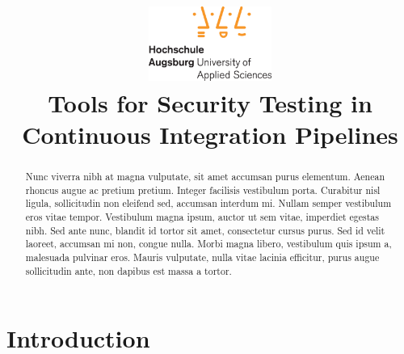\documentclass[conference]{IEEEtran}
\begin{document}
\title{
	\includegraphics[width=4cm]{fig/hsa_logo.eps}\\
	\vspace{0.6cm}
	Tools for Security Testing in Continuous Integration Pipelines}

\author{
}

\maketitle

% 

\begin{abstract}
	
	Nunc viverra nibh at magna vulputate, sit amet accumsan purus elementum. Aenean rhoncus augue ac pretium pretium. Integer facilisis vestibulum porta. Curabitur nisl ligula, sollicitudin non eleifend sed, accumsan interdum mi. Nullam semper vestibulum eros vitae tempor. Vestibulum magna ipsum, auctor ut sem vitae, imperdiet egestas nibh. Sed ante nunc, blandit id tortor sit amet, consectetur cursus purus. Sed id velit laoreet, accumsan mi non, congue nulla. Morbi magna libero, vestibulum quis ipsum a, malesuada pulvinar eros. Mauris vulputate, nulla vitae lacinia efficitur, purus augue sollicitudin ante, non dapibus est massa a tortor.
\end{abstract}


\section{Introduction}
\end{document}
